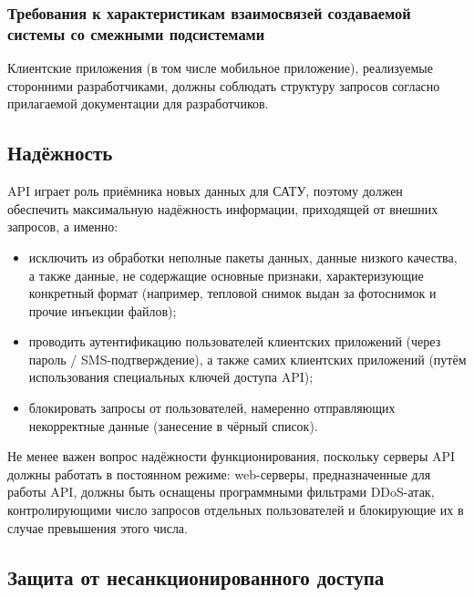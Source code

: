 \subsubsection{Требования к характеристикам взаимосвязей создаваемой системы со смежными подсистемами}

\par

	Клиентские приложения (в том числе мобильное приложение), реализуемые сторонними разработчиками, должны соблюдать структуру запросов согласно прилагаемой документации для разработчиков.

\subsection{Надёжность}

\par

	API играет роль приёмника новых данных для САТУ, поэтому должен обеспечить максимальную надёжность информации, приходящей от внешних запросов, а именно:

	\begin{itemize}
		\item исключить из обработки неполные пакеты данных, данные низкого качества, а также данные, не содержащие основные признаки, характеризующие конкретный формат (например, тепловой снимок выдан за фотоснимок и прочие инъекции файлов);
		\item проводить аутентификацию пользователей клиентских приложений (через пароль / SMS-подтверждение), а также самих клиентских приложений (путём использования специальных ключей доступа API);
		\item блокировать запросы от пользователей, намеренно отправляющих некорректные данные (занесение в чёрный список).
	\end{itemize}
	
	Не менее важен вопрос надёжности функционирования, поскольку серверы API должны работать в постоянном режиме: web-серверы, предназначенные для работы API, должны быть оснащены программными фильтрами DDoS-атак, контролирующими число запросов отдельных пользователей и блокирующие их в случае превышения этого числа.

\subsection{Защита от несанкционированного доступа}

\par

